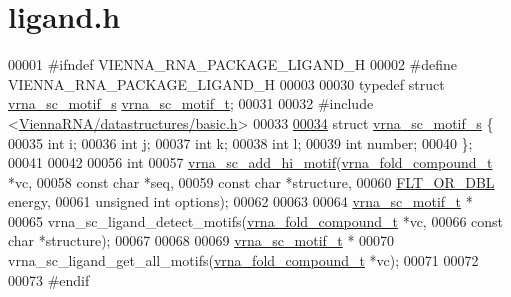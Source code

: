 \hypertarget{ligand_8h_source}{}\section{ligand.\+h}
\label{ligand_8h_source}

\begin{DoxyCode}
00001 \textcolor{preprocessor}{#ifndef VIENNA\_RNA\_PACKAGE\_LIGAND\_H}
00002 \textcolor{preprocessor}{#define VIENNA\_RNA\_PACKAGE\_LIGAND\_H}
00003 
00030 \textcolor{keyword}{typedef} \textcolor{keyword}{struct }\hyperlink{structvrna__sc__motif__s}{vrna\_sc\_motif\_s} \hyperlink{structvrna__sc__motif__s}{vrna\_sc\_motif\_t};
00031 
00032 \textcolor{preprocessor}{#include <\hyperlink{datastructures_2basic_8h}{ViennaRNA/datastructures/basic.h}>}
00033 
\hyperlink{structvrna__sc__motif__s}{00034} \textcolor{keyword}{struct }\hyperlink{structvrna__sc__motif__s}{vrna\_sc\_motif\_s} \{
00035   \textcolor{keywordtype}{int} i;
00036   \textcolor{keywordtype}{int} j;
00037   \textcolor{keywordtype}{int} k;
00038   \textcolor{keywordtype}{int} l;
00039   \textcolor{keywordtype}{int} number;
00040 \};
00041 
00042 
00056 \textcolor{keywordtype}{int}
00057 \hyperlink{group__constraints__ligand_gaa6ff0113a3a76dc0b8d62961f4e1dfa0}{vrna\_sc\_add\_hi\_motif}(\hyperlink{group__fold__compound_structvrna__fc__s}{vrna\_fold\_compound\_t} *vc,
00058                      \textcolor{keyword}{const} \textcolor{keywordtype}{char}           *seq,
00059                      \textcolor{keyword}{const} \textcolor{keywordtype}{char}           *structure,
00060                      \hyperlink{group__data__structures_ga31125aeace516926bf7f251f759b6126}{FLT\_OR\_DBL}           energy,
00061                      \textcolor{keywordtype}{unsigned} \textcolor{keywordtype}{int}         options);
00062 
00063 
00064 \hyperlink{structvrna__sc__motif__s}{vrna\_sc\_motif\_t} *
00065 vrna\_sc\_ligand\_detect\_motifs(\hyperlink{group__fold__compound_structvrna__fc__s}{vrna\_fold\_compound\_t} *vc,
00066                              \textcolor{keyword}{const} \textcolor{keywordtype}{char}           *structure);
00067 
00068 
00069 \hyperlink{structvrna__sc__motif__s}{vrna\_sc\_motif\_t} *
00070 vrna\_sc\_ligand\_get\_all\_motifs(\hyperlink{group__fold__compound_structvrna__fc__s}{vrna\_fold\_compound\_t} *vc);
00071 
00072 
00073 \textcolor{preprocessor}{#endif}
\end{DoxyCode}
